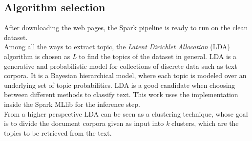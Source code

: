 \documentclass{sig-alternate-05-2015}
\begin{document}
\subsection{Algorithm selection}\label{algorithmSelection}
After downloading the web pages, the Spark pipeline is ready to run on the clean dataset.\\
Among all the ways to extract topic, the \emph{Latent Dirichlet Allocation}\cite{lda} (LDA) algorithm is chosen as \emph{L} to find the topics of the dataset in general. LDA is a generative and probabilistic model for collections of discrete data such as text corpora. It is a Bayesian hierarchical model, where each topic is modeled over an underlying set of topic probabilities. LDA is a good candidate when choosing between different methods to classify text. This work uses the implementation inside the Spark MLlib for the inference step.\\
From a higher perspective LDA can be seen as a clustering technique, whose goal is to divide the document corpora given as input into \emph{k} clusters, which are the topics to be retrieved from the text.
\end{document}
